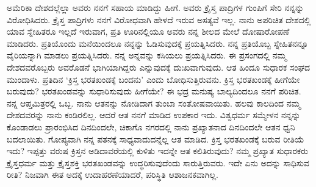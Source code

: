 ಅಮೆರಿಕಾ ದೇಶದಲ್ಲೆಲ್ಲಾ ಅವರು ನನಗೆ ಸಹಾಯ ಮಾಡಿದ್ದು ಹೀಗೆ. ಅವರು ಕ್ರೈಸ್ತ ಪಾದ್ರಿಗಳ ಗುಂಪಿಗೆ ಸೇರಿ ನನ್ನನ್ನು ವಿರೋಧಿಸಿದರು. ಕ್ರೈಸ್ತ ಪಾದ್ರಿಗಳು ನನಗೆ ವಿರೋಧವಾಗಿ ಹೇಳದೆ ಇರುವ ಅಸತ್ಯವೆ ಇಲ್ಲ. ನಾನು ಅಪರಿಚಿತ ದೇಶದಲ್ಲಿ ಯಾವ ಸ್ನೇಹಿತರೂ ಇಲ್ಲದೆ ಇರುವಾಗ, ಪ್ರತಿ ಊರಿನಲ್ಲಿಯೂ ಅವರು ನನ್ನ ಶೀಲದ ಮೇಲೆ ದೋಷಾರೋಪಣೆ ಮಾಡಿದರು. ಪ್ರತಿಯೊಂದು ಮನೆಯಿಂದಲೂ ನನ್ನನ್ನು ಓಡಿಸುವುದಕ್ಕೆ ಪ್ರಯತ್ನಿಸಿದರು. ನನ್ನ ಪ್ರತಿಯೊಬ್ಬ ಸ್ನೇಹಿತನನ್ನೂ ವೈರಿಯನ್ನಾಗಿ ಮಾಡಲು ಪ್ರಯತ್ನಿಸಿದರು. ನನ್ನ ಅನ್ನವನ್ನು ಕಸಿಯಲು ಪ್ರಯತ್ನಿಸಿದರು. ಈ ಪ್ರಸಂಗದಲ್ಲಿ ನಮ್ಮ ದೇಶದವರೊಬ್ಬರು ಅವರೊಡನೆ ಭಾಗಿಯಾಗಿದ್ದರು ಎನ್ನುವುದಕ್ಕೆ ದುಃಖವಾಗುವುದು. ಆತ ಹಿಂದೂ ಸುಧಾರಕ ಸಂಘದ ಮುಂದಾಳು. ಪ್ರತಿದಿನ ‘ಕ್ರಿಸ್ತ ಭರತಖಂಡಕ್ಕೆ ಬಂದನು’ ಎಂದು ಬೋಧಿಸುತ್ತಿರುವನು. ಕ್ರಿಸ್ತ ಭರತಖಂಡಕ್ಕೆ ಹೀಗೆಯೇ ಬರುವುದು? ಭರತಖಂಡವನ್ನು ಸುಧಾರಿಸುವುದು ಹೀಗೆಯೇ? ಈ ಭದ್ರ ಮನುಷ್ಯ ಬಾಲ್ಯದಿಂದಲೂ ನನಗೆ ಪರಿಚಿತ. ನನ್ನ ಆಪ್ತ\break ಮಿತ್ರರಲ್ಲಿ ಒಬ್ಬ. ನಾನು ಆತನನ್ನು ನೋಡಿದಾಗ ತುಂಬಾ ಸಂತೋಷವಾಯಿತು. ಹಲವು ಕಾಲದಿಂದ ನಮ್ಮ ದೇಶದವರನ್ನು ನಾನು ಕಂಡಿರಲಿಲ್ಲ. ಆದರೆ ಆತ ನನಗೆ ಮಾಡಿದ ಉಪಕಾರ ಇದು. ವಿಶ್ವಧರ್ಮ ಸಮ್ಮೇಳನ ನನ್ನನ್ನು ಕೊಂಡಾಡಲು ಪ್ರಾರಂಭಿಸಿದ ದಿನದಿಂದಲೇ, ಚಿಕಾಗೊ ನಗರದಲ್ಲಿ ನಾನು ಪ್ರಖ್ಯಾತನಾದ ದಿನದಿಂದಲೇ ಆತನ ಧ್ವನಿ ಬದಲಾಯಿತು. ಗೋಪ್ಯವಾಗಿ ನನ್ನ ಪತನಕ್ಕೆ ಸಾಧ್ಯವಾದುದನ್ನೆಲ್ಲ ಆತ ಮಾಡಿದ. ಕ್ರಿಸ್ತ ಭರತಖಂಡಕ್ಕೆ ಬರುವ ರೀತಿಯೆ ಇದು? ಇಪ್ಪತ್ತು ವರುಷ ಕ್ರಿಸ್ತನ ಅಡಿದಾವರೆಯಲ್ಲಿ ಕುಳಿತು ಇದನ್ನೇ ಆತ ಕಲಿತಿರುವುದು? ನಮ್ಮ ಪ್ರಖ್ಯಾತ ಸುಧಾರಕರು ಕ್ರೈಸ್ತಧರ್ಮ ಮತ್ತು ಕ್ರೈಸ್ತಶಕ್ತಿ ಭರತಖಂಡವನ್ನು ಉದ್ಧರಿಸುವುದೆಂದು ಸಾರುತ್ತಿರುವರು. ಇದೇ ಏನು ಅದನ್ನು ಸಾಧಿಸುವ ರೀತಿ? ನಿಜವಾಗಿ ಈತ ಅದಕ್ಕೆ ಉದಾಹರಣೆಯಾದರೆ, ಪರಿಸ್ಥಿತಿ ಆಶಾಜನಕವಾಗಿಲ್ಲ.

